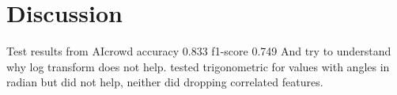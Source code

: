 \documentclass[10pt,conference,compsocconf]{IEEEtran}
\begin{document}
\begin{comment}
  \multicolumn{1}{l|}{Accuracy} &
  \multicolumn{1}{l|}{F1-score} &
  \multicolumn{1}{l|}{Accuracy} \\ \hline
\multicolumn{1}{|l|}{PRI\_jet\_0\_0} &
  1e-8 &
  10 &
  median &
  \multirow{6}{*}{61.66\%} &
  \multirow{6}{*}{87.76\%} &
  \multirow{6}{*}{59.05\%} &
  \multirow{6}{*}{87.20\%} &
  \multirow{6}{*}{75.30\%} &
  \multirow{6}{*}{83.50\%} \\ \cline{1-4}
\multicolumn{1}{|l|}{PRI\_jet\_0\_1}    & 1e-14     & 10     & median     &               &               &                &                &               &              \\ \cline{1-4}
\multicolumn{1}{|l|}{PRI\_jet\_1\_0}    & 1e-8      & 6      & mode       &               &               &                &                &               &              \\ \cline{1-4}
\multicolumn{1}{|l|}{PRI\_jet\_1\_1}    & 1e-16     & 10     & mode       &               &               &                &                &               &              \\ \cline{1-4}
\multicolumn{1}{|l|}{PRI\_jet\_2\_3\_0} & 1e-3      & 3      & mode       &               &               &                &                &               &              \\ \cline{1-4}
\multicolumn{1}{|l|}{PRI\_jet\_2\_3\_1} & 1e-15     & 11     & mode       &               &               &                &                &               &              \\ \hline
\end{tabular}%
}
\caption{Parameters, F1-score and accuracy results.}
\label{tab:6_models}
\end{table}
\end{comment}

\section{Discussion}

Test results from AIcrowd accuracy 0.833 f1-score 0.749	
And try to understand why log transform does not help. tested trigonometric 
for values with angles in radian but did not help, neither did dropping correlated features.
\end{document}
